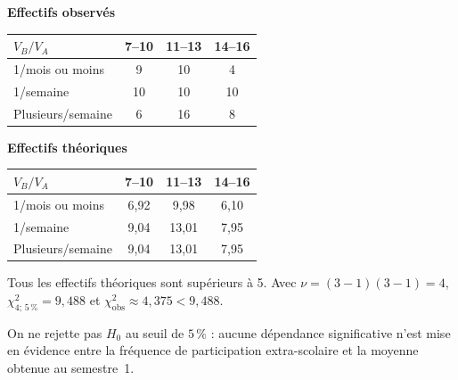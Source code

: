 \begin{center}
	\footnotesize
	
	\begin{minipage}{0.47\linewidth}
		\centering
		\textbf{Effectifs observés}
		
		\medskip
		
		\begin{tabular}{lccc}
			\toprule
			$V_B/V_A$ & 7--10 & 11--13 & 14--16\\
			\midrule
			1/mois ou moins & 9 & 10 & 4\\
			1/semaine & 10 & 10 & 10\\
			Plusieurs/semaine & 6 & 16 & 8\\
			\bottomrule
		\end{tabular}
	\end{minipage}
	\hfill
	\begin{minipage}{0.47\linewidth}
		\centering
		\textbf{Effectifs théoriques}
		
		\medskip
		
		\begin{tabular}{lccc}
			\toprule
			$V_B/V_A$ & 7--10 & 11--13 & 14--16\\
			\midrule
			1/mois ou moins & 6{,}92 & 9{,}98 & 6{,}10\\
			1/semaine & 9{,}04 & 13{,}01 & 7{,}95\\
			Plusieurs/semaine & 9{,}04 & 13{,}01 & 7{,}95\\
			\bottomrule
		\end{tabular}
	\end{minipage}
	
\end{center}

Tous les effectifs théoriques sont supérieurs à 5. Avec
$\nu=(3-1)(3-1)=4$, $\chi^2_{4;\,5\,\%}=9{,}488$ et
$\chi^2_{\mathrm{obs}}\approx4{,}375<9{,}488$.

On ne rejette pas $H_0$ au seuil de $5\,\%$ : aucune dépendance significative
n'est mise en évidence entre la fréquence de participation extra-scolaire et la
moyenne obtenue au semestre~1.